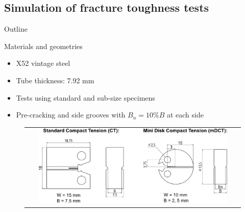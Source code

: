 \documentclass[9pt]{beamer}
\begin{document}

\subsection{Simulation of fracture toughness tests}

\begin{frame}{Outline}
	\tableofcontents[ 
    currentsubsection, 
    hideothersubsections, 
    sectionstyle=show/shaded, 
    subsectionstyle=show/shaded, 
    ] 
\end{frame}


\begin{frame}{Materials and geometries}

    \begin{itemize}
        \item X52 vintage steel
        \vspace{0.15cm}
        \item Tube thickness: 7.92 mm
        \vspace{0.15cm}
        \item Tests using standard and sub-size specimens
        \vspace{0.15cm}
        \item Pre-cracking and side grooves with $B_n = 10\%B$ at each side
    \end{itemize}
    
    \vspace{0.25cm}

    \begin{figure}
        \begin{tabular}{c}
            \includegraphics[width=0.9\textwidth]{Images/CT_mDCT_specimens_X52.pdf} \\
        \end{tabular}
    \end{figure}

\end{frame}
\end{document}
